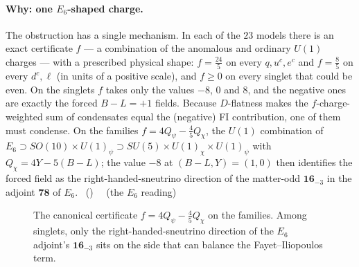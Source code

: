\paragraph{Why: one $E_6$-shaped charge.}
The obstruction has a single mechanism. In each of the $23$ models there is an exact
certificate $f$ --- a combination of the anomalous and ordinary $U(1)$ charges --- with a
prescribed physical shape: $f=\tfrac{24}{5}$ on every $q,u^c,e^c$ and $f=\tfrac85$ on every
$d^c,\ell$ (in units of a positive scale), and $f\ge0$ on every singlet that could be even.
On the singlets $f$ takes only the values $-8$, $0$ and $8$, and the negative ones are
exactly the forced $B-L=+1$ fields. Because $D$-flatness makes the $f$-charge-weighted sum of
condensates equal the (negative) FI contribution, one of them must condense. On the families
$f=4Q_\psi-\tfrac45Q_\chi$, the $U(1)$ combination of
$E_6\supset SO(10)\times U(1)_\psi\supset SU(5)\times U(1)_\chi\times U(1)_\psi$ with
$Q_\chi=4Y-5(B-L)$; the value $-8$ at $(B-L,Y)=(1,0)$ then identifies the forced field as the
right-handed-sneutrino direction of the matter-odd $\mathbf{16}_{-3}$ in the adjoint $\mathbf{78}$ of
$E_6$. \tierC\ () \ \tierB\ (the $E_6$ reading)

\begin{figure}[htbp]
\centering
{}
\caption{The canonical certificate $f=4Q_\psi-\tfrac45Q_\chi$ on the families. Among singlets,
only the right-handed-sneutrino direction of the $E_6$ adjoint's $\mathbf{16}_{-3}$ sits on the
side that can balance the Fayet--Iliopoulos term.}
\label{fig:fline}
\end{figure}

